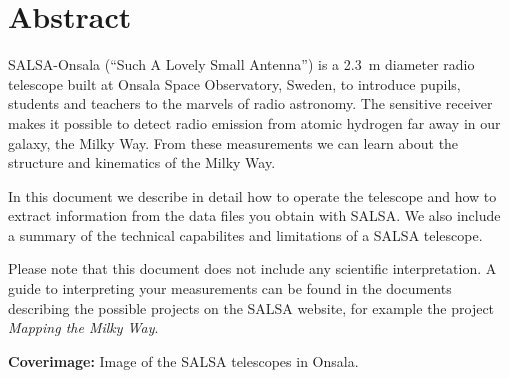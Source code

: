 \chapter*{Abstract}
SALSA-Onsala (``Such A Lovely Small Antenna'') is a 2.3~m diameter radio
telescope built at Onsala Space Observatory, Sweden, to introduce pupils,
students and teachers to the marvels of radio astronomy.  The sensitive
receiver makes it possible to detect radio emission from atomic hydrogen far
away in our galaxy, the Milky Way. From these measurements we can learn about
the structure and kinematics of the Milky Way.

In this document we describe in detail how to operate the telescope
and how to extract information from the data files you obtain with SALSA.
We also include a summary of the technical capabilites and limitations
of a SALSA telescope.

Please note that this document does not include any scientific interpretation.
A guide to interpreting your measurements can be found in the documents 
describing the possible projects on the SALSA website, for example the project
\emph{Mapping the Milky Way}.

\vspace{9cm}




{\bf Coverimage:} Image of the SALSA telescopes in Onsala.
